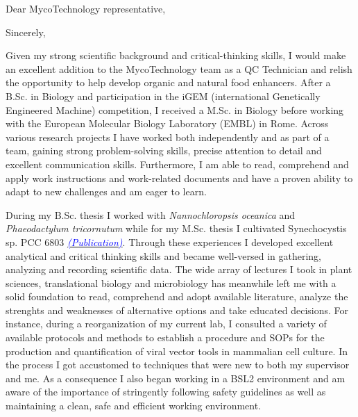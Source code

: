 \documentclass[11pt,a4paper,sans]{moderncv}
\begin{document}
\date{\today}
\opening{Dear MycoTechnology representative,\vspace{-2mm}}
\closing{Sincerely,\vspace*{-4mm} }
\makelettertitle
\begin{spacing}{1.15}

Given my strong scientific background and critical-thinking skills, I would make an excellent addition to the MycoTechnology team as a QC Technician and relish the opportunity to help develop organic and natural food enhancers. After a B.Sc. in Biology and participation in the iGEM (international Genetically Engineered Machine) competition, I received a M.Sc. in Biology before working with the European Molecular Biology Laboratory (EMBL) in Rome. Across various research projects I have worked both independently and as part of a team, gaining strong problem-solving skills, precise attention to detail and excellent communication skills. Furthermore, I am able to read, comprehend and apply work instructions and work-related documents and have a proven ability to adapt to new challenges and am eager to learn.\par\vspace*{2mm}

During my B.Sc. thesis I worked with \textit{Nannochloropsis oceanica} and \textit{Phaeodactylum tricornutum} while for my M.Sc. thesis I cultivated Synechocystis sp. PCC 6803 {\href{https://www.ncbi.nlm.nih.gov/pubmed/29517395}{\textcolor{blue}{{\textit{(Publication)}}}}}. Through these experiences I developed excellent analytical and critical thinking skills and became well-versed in gathering, analyzing and recording scientific data. The wide array of lectures I took in plant sciences, translational biology and microbiology has meanwhile left me with a solid foundation to read, comprehend and adopt available literature, analyze the strenghts and weaknesses of alternative options and take educated decisions. For instance, during a reorganization of my current lab, I consulted a variety of available protocols and methods to establish a procedure and SOPs for the production and quantification of viral vector tools in mammalian cell culture. In the process I got accustomed to  techniques that were new to both my supervisor and me. As a consequence I also began working in a BSL2 environment and am aware of the importance of stringently following safety guidelines as well as maintaining a clean, safe and efficient working environment.\par\vspace*{2mm}


\end{spacing}
\end{document}

